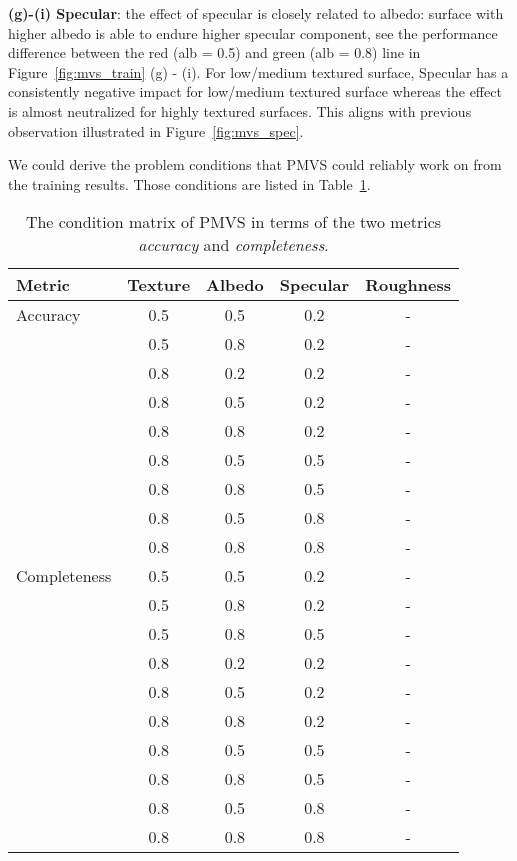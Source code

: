 \noindent\textbf{(g)-(i) Specular}: the effect of specular is closely related to albedo: surface with higher albedo is able to endure higher specular component, see the performance difference between the red (alb = 0.5) and green (alb = 0.8) line in Figure~\ref{fig:mvs_train} (g) - (i). For low/medium textured surface, Specular has a consistently negative impact for low/medium textured surface whereas the effect is almost neutralized for highly textured surfaces. This aligns with previous observation illustrated in Figure~\ref{fig:mvs_spec}.

We could derive the problem conditions that PMVS could reliably work on from the training results. Those conditions are listed in Table~\ref{tab:mvs_training_result}.
\begin{table}[!htbp]
  \centering
  \begin{tabular}{l*{4}{c}}
  \hline
  \textbf{Metric} & Texture & Albedo & Specular & Roughness\\
  \hline
  Accuracy & 0.5 & 0.5 & 0.2 & -\\
           & 0.5 & 0.8 & 0.2 & -\\
           & 0.8 & 0.2 & 0.2 & -\\
           & 0.8 & 0.5 & 0.2 & -\\
           & 0.8 & 0.8 & 0.2 & -\\
           & 0.8 & 0.5 & 0.5 & -\\
           & 0.8 & 0.8 & 0.5 & -\\
           & 0.8 & 0.5 & 0.8 & -\\
           & 0.8 & 0.8 & 0.8 & -\\
  \hline
  Completeness & 0.5 & 0.5 & 0.2 & -\\
               & 0.5 & 0.8 & 0.2 & -\\
               & 0.5 & 0.8 & 0.5 & -\\
               & 0.8 & 0.2 & 0.2 & -\\
               & 0.8 & 0.5 & 0.2 & -\\
               & 0.8 & 0.8 & 0.2 & -\\
               & 0.8 & 0.5 & 0.5 & -\\
               & 0.8 & 0.8 & 0.5 & -\\
               & 0.8 & 0.5 & 0.8 & -\\
               & 0.8 & 0.8 & 0.8 & -\\
  \hline
  \end{tabular}
  \caption{The condition matrix of PMVS in terms of the two metrics \textit{accuracy} and \textit{completeness}.}
  \label{tab:mvs_training_result}
\end{table}

